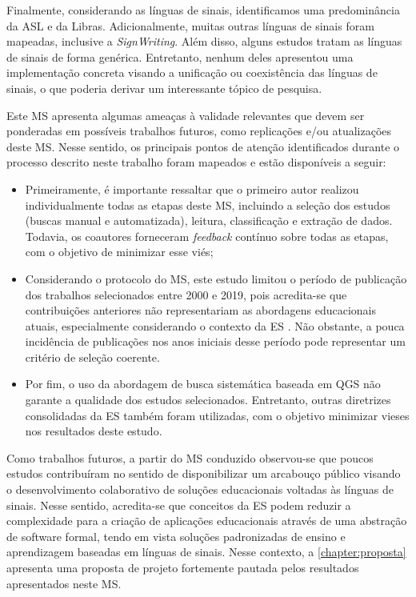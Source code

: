 Finalmente, considerando as línguas de sinais, identificamos uma predominância da ASL e da Libras. Adicionalmente, muitas outras línguas de sinais foram mapeadas, inclusive a \textit{SignWriting}. Além disso, alguns estudos tratam as línguas de sinais de forma genérica. Entretanto, nenhum deles apresentou uma implementação concreta visando a unificação ou coexistência das línguas de sinais, o que poderia derivar um interessante tópico de pesquisa.

Este MS apresenta algumas ameaças à validade relevantes que devem ser ponderadas em possíveis trabalhos futuros, como replicações e/ou atualizações deste MS. Nesse sentido, os principais pontos de atenção identificados durante o processo descrito neste trabalho foram mapeados e estão disponíveis a seguir:

\begin{itemize}
\item Primeiramente,  é importante ressaltar que o primeiro autor realizou individualmente todas as etapas deste MS, incluindo a seleção dos estudos (buscas manual e automatizada), leitura, classificação e extração de dados. Todavia, os coautores forneceram \textit{feedback} contínuo sobre todas as etapas, com o objetivo de minimizar esse viés; 
\item Considerando o protocolo do MS, este estudo limitou o período de publicação dos trabalhos selecionados entre 2000 e 2019, pois acredita-se que contribuições anteriores não representariam as abordagens educacionais atuais, especialmente considerando o contexto da ES \cite{Radermacher2013,Scatalon2019}. Não obstante, a pouca incidência de publicações nos anos iniciais desse período pode representar um critério de seleção coerente.
\item Por fim, o uso da abordagem de busca sistemática baseada em QGS não garante a qualidade dos estudos selecionados. Entretanto, outras diretrizes consolidadas da ES também foram utilizadas, com o objetivo minimizar vieses nos resultados deste estudo.
\end{itemize}

Como trabalhos futuros, a partir do MS conduzido observou-se que poucos estudos contribuíram no sentido de disponibilizar um arcabouço público visando o desenvolvimento colaborativo de soluções educacionais voltadas às línguas de sinais. Nesse sentido, acredita-se que conceitos da ES podem reduzir a complexidade para a criação de aplicações educacionais através de uma abstração de software formal, tendo em vista soluções padronizadas de ensino e aprendizagem baseadas em línguas de sinais. Nesse contexto, a \autoref{chapter:proposta} apresenta uma proposta de projeto fortemente pautada pelos resultados apresentados neste MS.